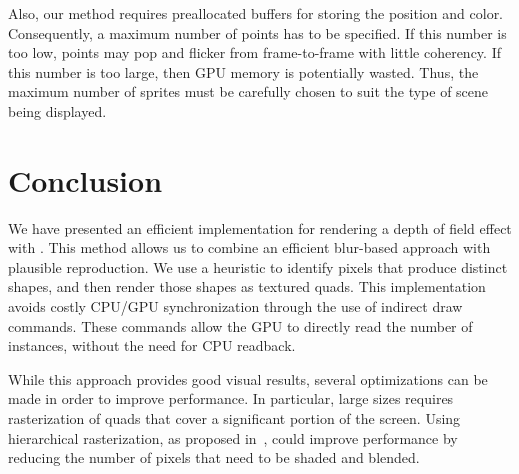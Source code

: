 Also, our method requires preallocated buffers for storing the \bokeh position and color. Consequently, a maximum number of \bokeh points has to be specified. If this number is too low, \bokeh points may pop and flicker from frame-to-frame with little coherency. If this number is too large, then GPU memory is potentially wasted. Thus, the maximum number of sprites must be carefully chosen to suit the type of scene being displayed.

\section{Conclusion}
We have presented an efficient implementation for rendering a depth of field effect with \bokeh. This method allows us to combine an efficient blur-based approach with plausible \bokeh reproduction. We use a heuristic to identify pixels that produce distinct \bokeh shapes, and then render those shapes as textured quads. This implementation avoids costly CPU/GPU synchronization through the use of indirect draw commands. These commands allow the GPU to directly read the number of instances, without the need for CPU readback.

While this approach provides good visual results, several optimizations can be made in order to improve performance. In particular, large \coc sizes requires rasterization of quads that cover a significant portion of the screen. Using hierarchical rasterization, as proposed in~\cite{Futurmark11}, could improve performance by reducing the number of pixels that need to be shaded and blended.



